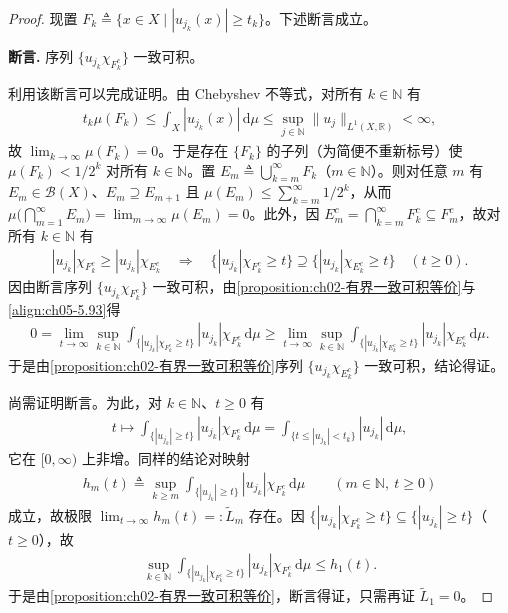 \documentclass[../../main.tex]{subfiles}
\begin{document}
\begin{proof}
现置 $F_k\triangleq\{x\in X\mid|u_{j_k}(x)|\geqslant t_k\}$。下述断言成立。

\textbf{断言.} 序列 $\{u_{j_k}\chi_{F_k^c}\}$ 一致可积。

利用该断言可以完成证明。由 Chebyshev 不等式，对所有 $k\in\mathbb{N}$ 有
\begin{align*}
t_k\mu(F_k)\leqslant\int_X|u_{j_k}(x)|\,\mathrm{d}\mu\leqslant\sup_{j\in\mathbb{N}}\|u_j\|_{L^1(X,\mathbb{R})}<\infty,
\end{align*}
故 $\lim_{k\to\infty}\mu(F_k)=0$。于是存在 $\{F_k\}$ 的子列（为简便不重新标号）使 $\mu(F_k)<1/2^k$ 对所有 $k\in\mathbb{N}$。置 $E_m\triangleq\bigcup_{k=m}^\infty F_k$（$m\in\mathbb{N}$）。则对任意 $m$ 有 $E_m\in\mathscr{B}(X)$、$E_m\supseteq E_{m+1}$ 且 $\mu(E_m)\leqslant\sum_{k=m}^\infty1/2^k$，从而 $\mu\big(\bigcap_{m=1}^\infty E_m\big)=\lim_{m\to\infty}\mu(E_m)=0$。此外，因 $E_m^c=\bigcap_{k=m}^\infty F_k^c\subseteq F_m^c$，故对所有 $k\in\mathbb{N}$ 有
\begin{align}
|u_{j_k}|\chi_{F_k^c}\geqslant|u_{j_k}|\chi_{E_k^c}
\quad\Rightarrow\quad
\{|u_{j_k}|\chi_{F_k^c}\geqslant t\}\supseteq\{|u_{j_k}|\chi_{E_k^c}\geqslant t\}
\quad(t\geqslant0).\label{align:ch05-5.93}
\end{align}
因由断言序列 $\{u_{j_k}\chi_{F_k^c}\}$ 一致可积，由\cref{proposition:ch02-有界一致可积等价}与\eqref{align:ch05-5.93}得
\begin{align*}
0=\lim_{t\to\infty}\sup_{k\in\mathbb{N}}\int_{\{|u_{j_k}|\chi_{F_k^c}\geqslant t\}}|u_{j_k}|\chi_{F_k^c}\,\mathrm{d}\mu
\geqslant\lim_{t\to\infty}\sup_{k\in\mathbb{N}}\int_{\{|u_{j_k}|\chi_{E_k^c}\geqslant t\}}|u_{j_k}|\chi_{E_k^c}\,\mathrm{d}\mu.
\end{align*}
于是由\cref{proposition:ch02-有界一致可积等价}序列 $\{u_{j_k}\chi_{E_k^c}\}$ 一致可积，结论得证。

尚需证明断言。为此，对 $k\in\mathbb{N}$、$t\geqslant0$ 有
\begin{align*}
t\mapsto\int_{\{|u_{j_k}|\geqslant t\}}|u_{j_k}|\chi_{F_k^c}\,\mathrm{d}\mu
=\int_{\{t\leqslant|u_{j_k}|<t_k\}}|u_{j_k}|\,\mathrm{d}\mu,
\end{align*}
它在 $[0,\infty)$ 上非增。同样的结论对映射
\begin{align*}
h_m(t)\triangleq\sup_{k\geqslant m}\int_{\{|u_{j_k}|\geqslant t\}}|u_{j_k}|\chi_{F_k^c}\,\mathrm{d}\mu
\qquad(m\in\mathbb{N},\ t\geqslant0)
\end{align*}
成立，故极限 $\lim_{t\to\infty}h_m(t)=:\tilde L_m$ 存在。因 $\{|u_{j_k}|\chi_{F_k^c}\geqslant t\}\subseteq\{|u_{j_k}|\geqslant t\}$（$t\geqslant0$），故
\begin{align*}
\sup_{k\in\mathbb{N}}\int_{\{|u_{j_k}|\chi_{F_k^c}\geqslant t\}}|u_{j_k}|\chi_{F_k^c}\,\mathrm{d}\mu\leqslant h_1(t).
\end{align*}
于是由\cref{proposition:ch02-有界一致可积等价}，断言得证，只需再证 $\tilde L_1=0$。


\end{proof}
\end{document}
